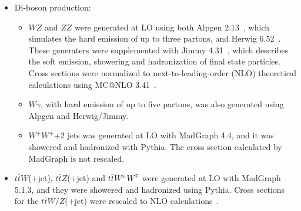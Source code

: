 \begin{itemize}
\item Di-boson production:
  \begin{itemize}
  \item $WZ$ and $ZZ$ were generated at LO using both {\sc Alpgen} 2.13~\cite{Mangano:2002ea}, which simulates the hard emission of up to three partons, and {\sc Herwig} 6.52~\cite{COR-0001}.
    These generaters were supplemented with {\sc Jimmy} 4.31~\cite{JButterworth:1996zw}, which describes the soft emission, showering and hadronization of final state particles. 
    Cross sections were normalized to next-to-leading-order (NLO) theoretical calculations using {\sc MC@NLO} 3.41~\cite{Frixione:2002ik}.
  \item $W\gamma$, with hard emission of up to five partons, was also generated using {\sc Alpgen} and {\sc Herwig/Jimmy}.
  \item $W^{\pm}W^{\pm}$+2 jets was generated at LO with {\sc MadGraph} 4.4, and it was showered and hadronized with {\sc Pythia}. 
    The cross section calculated by {\sc MadGraph} is not rescaled.
  \end{itemize} 
\item $t\bar{t}W$(+jet), $t\bar{t}Z$(+jet) and $t\bar{t}W^{\pm}W^{\mp}$ were generated at LO with {\sc MadGraph} 5.1.3, and they were showered and hadronized using {\sc Pythia}. 
  Cross sections for the $t\bar{t}W/Z$(+jet) were rescaled to NLO calculations~\cite{Campbell:2012dh,Garzelli:2011is}.
\end{itemize}



